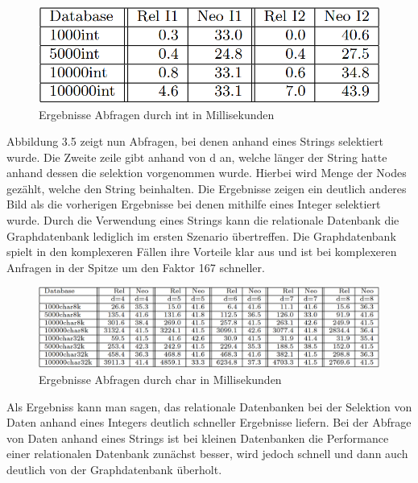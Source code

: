  \citep{graphrelationaldb}
\begin{figure}[H]
	\centering
	\includegraphics[scale=.5]{Illustrations/dbresultsint.png}
	\caption{Ergebnisse Abfragen durch int in Millisekunden \citep{graphrelationaldb}}
\end{figure}
\noindent
Abbildung 3.5 zeigt nun Abfragen, bei denen anhand eines Strings selektiert wurde. Die Zweite zeile gibt anhand von d an, welche länger der String hatte anhand dessen die selektion vorgenommen wurde. Hierbei wird Menge der Nodes gezählt, welche den String beinhalten. Die Ergebnisse zeigen ein deutlich anderes Bild als die vorherigen Ergebnisse bei denen mithilfe eines Integer selektiert wurde. Durch die Verwendung eines Strings kann die relationale Datenbank die Graphdatenbank lediglich im ersten Szenario übertreffen. Die Graphdatenbank spielt in den komplexeren Fällen ihre Vorteile klar aus und ist bei komplexeren Anfragen in der Spitze um den Faktor 167 schneller. 
 \citep{graphrelationaldb}
\begin{figure}[H]
	\centering
	\includegraphics[scale=.425]{Illustrations/dbresultschar.png}
	\caption{Ergebnisse Abfragen durch char in Millisekunden \citep{graphrelationaldb}}
\end{figure}
\noindent
Als Ergebniss kann man sagen, das relationale Datenbanken bei der Selektion von Daten anhand eines Integers deutlich schneller Ergebnisse liefern. Bei der Abfrage von Daten anhand eines Strings ist bei kleinen Datenbanken die Performance einer relationalen Datenbank zunächst besser, wird jedoch schnell und dann auch deutlich von der Graphdatenbank überholt.
